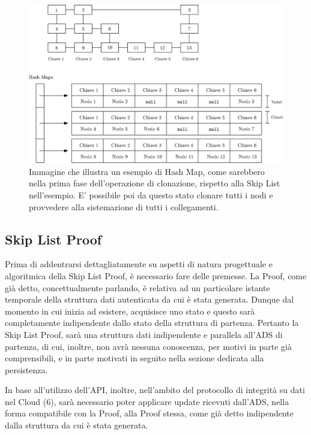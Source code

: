 	\begin{figure}
		\centering
		\includegraphics[scale=0.6]{figure/cloneADS.eps}
		\caption{Immagine che illustra un esempio di Hash Map, come sarebbero nella prima fase dell'operazione di clonazione, rispetto alla Skip List nell'esempio. E' possibile poi da questo stato clonare tutti i nodi e provvedere alla sistemazione di tutti i collegamenti.}\label{fig:cloneADS}
	\end{figure}
	
	\subsection{Skip List Proof}
	
	

		Prima di addentrarsi dettagliatamente su aspetti di natura progettuale e algoritmica della Skip List Proof, è necessario fare delle premesse. La Proof, come già detto, concettualmente parlando, è relativa ad un particolare istante temporale della struttura dati autenticata da cui è stata generata. Dunque dal momento in cui inizia ad esistere, acquisisce uno stato e questo sarà completamente indipendente dallo stato della struttura di partenza. Pertanto la Skip List Proof, sarà una struttura dati indipendente e parallela all'ADS di partenza, di cui, inoltre, non avrà nessuna conoscenza, per motivi in parte già comprensibili, e in parte motivati in seguito nella sezione dedicata alla persistenza.

		In base all'utilizzo dell'API, inoltre, nell'ambito del protocollo di integrità su dati nel Cloud (6), sarà necessario poter applicare update ricevuti dall'ADS, nella forma compatibile con la Proof, alla Proof stessa, come già detto indipendente dalla struttura da cui è stata generata.
		
